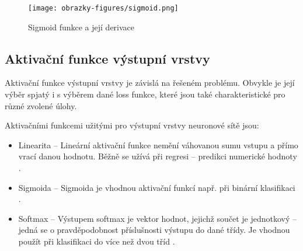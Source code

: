 \begin{figure}[!htbp]
    \centering
    \texttt{[image: obrazky-figures/sigmoid.png]}
    \caption{Sigmoid funkce a její derivace \cite{VanishingGradientProblem}}
    \label{fig:sigmoid}
\end{figure}



\subsection*{Aktivační funkce výstupní vrstvy}
Aktivační funkce výstupní vrstvy je závislá na řešeném problému. Obvykle je její výběr spjatý i s výběrem dané loss funkce, které jsou také charakteristické pro různé zvolené úlohy.

Aktivačními funkcemi užitými pro výstupní vrstvy neuronové sítě jsou:
\begin{itemize}
    \item Linearita -- Lineární aktivační funkce nemění váhovanou sumu vstupu a přímo vrací danou hodnotu. Běžně se užívá při regresi -- predikci numerické hodnoty \cite{HowToChooseActivationFunction}.
    \item Sigmoida -- Sigmoida je vhodnou aktivační funkcí např. při binární klasifikaci \cite{HowToChooseActivationFunction}.
    \item Softmax -- Výstupem softmax je vektor hodnot, jejichž součet je jednotkový -- jedná se o pravděpodobnost příslušnosti výstupu do dané třídy. Je vhodnou použít při klasifikaci do více než dvou tříd \cite{HowToChooseActivationFunction}. 
\end{itemize}


